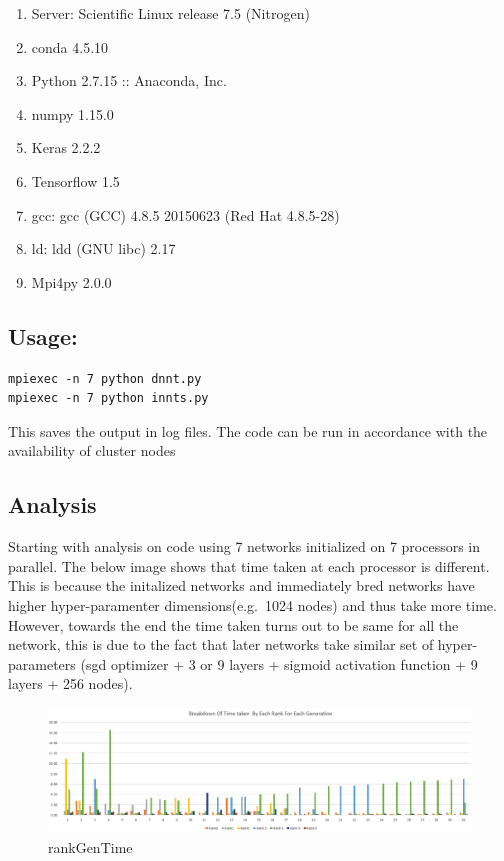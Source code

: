 \documentclass[]{article}
\providecommand{\tightlist}{%
  \setlength{\itemsep}{0pt}\setlength{\parskip}{0pt}}
\begin{document}
\begin{enumerate}
\def\labelenumi{\arabic{enumi}.}
\tightlist
\item
  Server: Scientific Linux release 7.5 (Nitrogen)
\item
  conda 4.5.10
\item
  Python 2.7.15 :: Anaconda, Inc.
\item
  numpy 1.15.0
\item
  Keras 2.2.2
\item
  Tensorflow 1.5
\item
  gcc: gcc (GCC) 4.8.5 20150623 (Red Hat 4.8.5-28)
\item
  ld: ldd (GNU libc) 2.17
\item
  Mpi4py 2.0.0
\end{enumerate}

\subsection{Usage:}\label{usage}

\begin{verbatim}
mpiexec -n 7 python dnnt.py
mpiexec -n 7 python innts.py
\end{verbatim}

This saves the output in log files. The code can be run in accordance
with the availability of cluster nodes

\subsection{Analysis}\label{analysis}

Starting with analysis on code using 7 networks initialized on 7
processors in parallel. The below image shows that time taken at each
processor is different. This is because the initalized networks and
immediately bred networks have higher hyper-paramenter
dimensions(e.g.~1024 nodes) and thus take more time. However, towards
the end the time taken turns out to be same for all the network, this is
due to the fact that later networks take similar set of hyper-parameters
(sgd optimizer + 3 or 9 layers + sigmoid activation function + 9 layers
+ 256 nodes).

\begin{figure}[htbp]
\centering
\includegraphics{./Images/Multiple-deme/rank_gen_timeTaken.PNG}
\caption{rankGenTime}
\end{figure}
\end{document}
